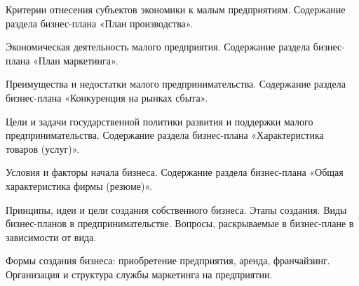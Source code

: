\documentclass[
	14pt,
	a4paper,
	]
	{scrartcl}
\begin{document}
\vfill
\z Критерии отнесения субъектов экономики к малым предприятиям.
 \vfill
\z Содержание раздела бизнес-плана «План производства».
 \vfill

\vfill

\newpage


\shapk
{}
\setcounter{zad}{0}

\vfill
\z Экономическая деятельность малого предприятия.
 \vfill
\z Содержание раздела бизнес-плана «План маркетинга».
 \vfill

\vfill

\newpage


\shapk
{}
\setcounter{zad}{0}

\vfill
\z Преимущества и недостатки малого предпринимательства.
 \vfill
\z Содержание раздела бизнес-плана «Конкуренция на рынках сбыта».
 \vfill

\vfill

\newpage


\shapk
{}
\setcounter{zad}{0}

\vfill
\z Цели и задачи государственной политики развития и поддержки малого предпринимательства.
 \vfill
\z Содержание раздела бизнес-плана «Характеристика товаров (услуг)».
 \vfill

\vfill

\newpage


\shapk
{}
\setcounter{zad}{0}

\vfill
\z Условия и факторы начала бизнеса.
 \vfill
\z Содержание раздела бизнес-плана «Общая характеристика фирмы (резюме)».
 \vfill

\vfill

\newpage


\shapk
{}
\setcounter{zad}{0}

\vfill
\z Принципы, идеи и цели создания собственного бизнеса. Этапы создания.
 \vfill
\z Виды бизнес-планов в предпринимательстве. Вопросы, раскрываемые в бизнес-плане в зависимости от вида.
 \vfill

\vfill

\newpage


\shapk
{}
\setcounter{zad}{0}

\vfill
\z Формы создания бизнеса: приобретение предприятия, аренда, франчайзинг.
 \vfill
\z Организация и структура службы маркетинга на предприятии.
 \vfill

\vfill

\newpage
\end{document}
